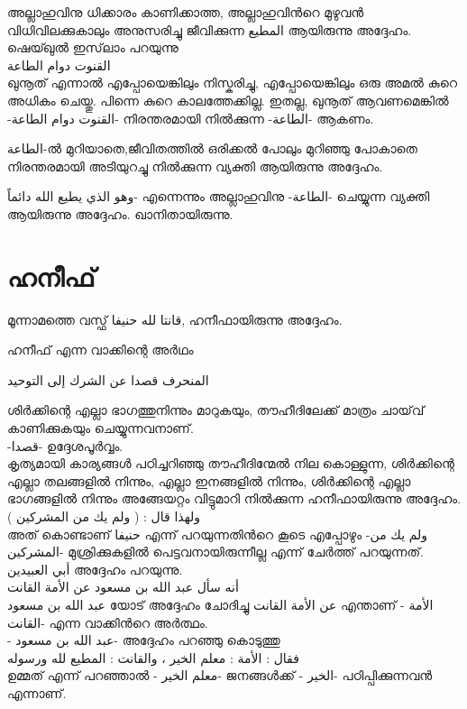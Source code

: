    അല്ലാഹുവിനു ധിക്കാരം കാണിക്കാത്ത, അല്ലാഹുവിൻറെ മുഴുവൻ വിധിവിലക്കുകാലും അനുസരിച്ചു ജീവിക്കുന്ന  \textarabic{المطيع} ആയിരുന്നു അദ്ദേഹം. \\
     ഷെയ്ഖുൽ ഇസ്‌ലാം പറയുന്നു \\ \textarabic{القنوت دوام الطاعة} \\ 
     ഖുനൂത് എന്നാൽ 
     എപ്പോയെങ്കിലും നിസ്കരിച്ചു,  എപ്പോയെങ്കിലും ഒരു അമൽ കുറെ അധികം ചെയ്തു. പിന്നെ കുറെ കാലത്തേക്കില്ല. ഇതല്ല, ഖുനൂത് ആവണമെങ്കിൽ -\textarabic{القنوت دوام الطاعة}- നിരന്തരമായി നിൽക്കുന്ന -\textarabic{الطاعة}- ആകണം. 
     
     \textarabic{الطاعة}-ൽ മുറിയാതെ,ജീവിതത്തിൽ ഒരിക്കൽ പോലും മുറിഞ്ഞു പോകാതെ നിരന്തരമായി അടിയുറച്ചു നിൽക്കുന്ന വ്യക്തി ആയിരുന്നു അദ്ദേഹം. 

\textarabic{وهو الذي يطيع الله دائماً}- എന്നെന്നും അല്ലാഹുവിനു -\textarabic{الطاعة}- ചെയ്യുന്ന വ്യക്തി ആയിരുന്നു അദ്ദേഹം. ഖാനിതായിരുന്നു. \\

  \textarabic{\quranayah[16][120]} 
  
 \section*{\textmalayalam{ഹനീഫ്}}
 
  മൂന്നാമത്തെ വസ്ഫ് \textarabic{ قانتا لله حنيفا},  ഹനീഫായിരുന്നു അദ്ദേഹം. 
  
  ഹനീഫ് എന്ന വാക്കിന്റെ അർഥം 
  
  \textarabic{المنحرف قصدا عن الشرك إلى التوحيد}

  
  ശിർക്കിന്റെ എല്ലാ ഭാഗത്തുനിന്നും മാറുകയും, തൗഹീദിലേക്ക് മാത്രം ചായ്‌വ് കാണിക്കുകയും ചെയ്യുന്നവനാണ്. \\
  -\textarabic{قصدا}- ഉദ്ദേശപൂർവ്വം. \\
  കൃത്യമായി കാര്യങ്ങൾ പഠിച്ചറിഞ്ഞു തൗഹീദിന്മേൽ നില കൊള്ളുന്ന, ശിർക്കിന്റെ എല്ലാ തലങ്ങളിൽ നിന്നും, എല്ലാ ഇനങ്ങളിൽ നിന്നും, ശിർക്കിന്റെ എല്ലാ ഭാഗങ്ങളിൽ നിന്നും അങ്ങേയറ്റം വിട്ടുമാറി നിൽക്കുന്ന ഹനീഫായിരുന്നു അദ്ദേഹം. \\
  
  
 \textarabic{ولهذا قال : ( ولم يك من المشركين )} \\
  അത് കൊണ്ടാണ്‌  \textarabic{حنيفا} എന്ന് പറയുന്നതിൻറെ കൂടെ എപ്പോഴും  -\textarabic{ولم يك من المشركين}- മുശ്രിക്കുകളിൽ പെട്ടവനായിരുന്നീല്ല എന്ന് ചേർത്ത് പറയുന്നത്. 
  \\
  
 
 \textarabic{ أبي العبيدين} അദ്ദേഹം പറയുന്നു. \\
 \textarabic{أنه سأل عبد الله بن مسعود عن الأمة القانت} \\
 \textarabic{عبد الله بن مسعود} യോട് അദ്ദേഹം ചോദിച്ചു 
  \textarabic{ عن الأمة القانت}
  എന്താണ് -  \textarabic{  الأمة القانت}- എന്ന വാക്കിൻറെ അർത്ഥം. \\
 - \textarabic{عبد الله بن مسعود}- അദ്ദേഹം പറഞ്ഞു കൊടുത്തു \\
  \textarabic{فقال : الأمة : معلم الخير ، والقانت : المطيع لله ورسوله } \\
  ഉമ്മത് എന്ന് പറഞ്ഞാൽ -\textarabic{ معلم الخير}- 
  ജനങ്ങൾക്ക് -\textarabic{ الخير}- പഠിപ്പിക്കുന്നവൻ എന്നാണ്. 
  
